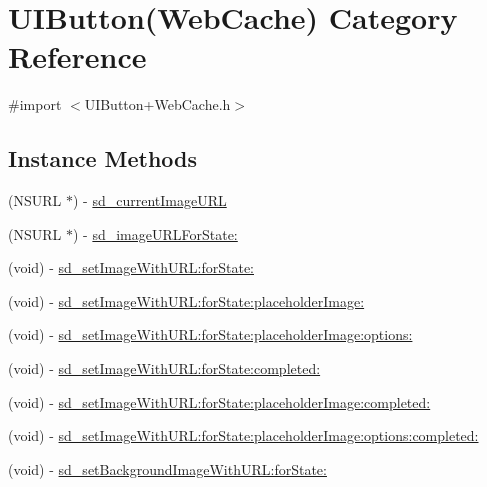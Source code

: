 \hypertarget{category_u_i_button_07_web_cache_08}{}\section{U\+I\+Button(Web\+Cache) Category Reference}
\label{category_u_i_button_07_web_cache_08}


{\ttfamily \#import $<$U\+I\+Button+\+Web\+Cache.\+h$>$}

\subsection*{Instance Methods}
\begin{DoxyCompactItemize}
\item 
(N\+S\+U\+R\+L $\ast$) -\/ \hyperlink{category_u_i_button_07_web_cache_08_a8ea1e28175c50110fda5b08ccbcf9475}{sd\+\_\+current\+Image\+U\+R\+L}
\item 
(N\+S\+U\+R\+L $\ast$) -\/ \hyperlink{category_u_i_button_07_web_cache_08_a980c6b65dd457fcf4498763dd3e79ff0}{sd\+\_\+image\+U\+R\+L\+For\+State\+:}
\item 
(void) -\/ \hyperlink{category_u_i_button_07_web_cache_08_a34dbc58147cf50ff38cf36bd04ad1ad8}{sd\+\_\+set\+Image\+With\+U\+R\+L\+:for\+State\+:}
\item 
(void) -\/ \hyperlink{category_u_i_button_07_web_cache_08_a4ea07135cafe137ffe9bab9de73963d5}{sd\+\_\+set\+Image\+With\+U\+R\+L\+:for\+State\+:placeholder\+Image\+:}
\item 
(void) -\/ \hyperlink{category_u_i_button_07_web_cache_08_abda02031e7bc7b423a5e06d1d135b6b6}{sd\+\_\+set\+Image\+With\+U\+R\+L\+:for\+State\+:placeholder\+Image\+:options\+:}
\item 
(void) -\/ \hyperlink{category_u_i_button_07_web_cache_08_a2c5fb6a70015fde982b90e34062000cd}{sd\+\_\+set\+Image\+With\+U\+R\+L\+:for\+State\+:completed\+:}
\item 
(void) -\/ \hyperlink{category_u_i_button_07_web_cache_08_a66ffc085587aebe2b3d7cd23012ff0d0}{sd\+\_\+set\+Image\+With\+U\+R\+L\+:for\+State\+:placeholder\+Image\+:completed\+:}
\item 
(void) -\/ \hyperlink{category_u_i_button_07_web_cache_08_a0b9ab2828dfe9cecdb618cd79d20611f}{sd\+\_\+set\+Image\+With\+U\+R\+L\+:for\+State\+:placeholder\+Image\+:options\+:completed\+:}
\item 
(void) -\/ \hyperlink{category_u_i_button_07_web_cache_08_af83d3c4073068094999c0653b0746eab}{sd\+\_\+set\+Background\+Image\+With\+U\+R\+L\+:for\+State\+:}

\end{DoxyCompactItemize}
